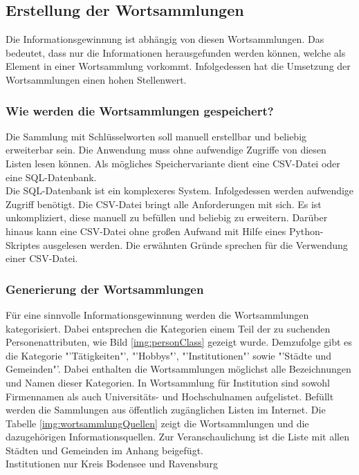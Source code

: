	\subsection{Erstellung der Wortsammlungen}
	Die Informationsgewinnung ist abhängig von diesen Wortsammlungen. Das bedeutet, dass nur die Informationen herausgefunden werden können, welche als Element in einer Wortsammlung vorkommt. Infolgedessen hat die Umsetzung der Wortsammlungen einen hohen Stellenwert.
	
		\subsubsection{Wie werden die Wortsammlungen gespeichert?}
		Die Sammlung mit Schlüsselworten soll manuell erstellbar und beliebig erweiterbar sein. Die Anwendung muss ohne aufwendige Zugriffe von diesen Listen lesen können. Als mögliches Speichervariante dient eine CSV-Datei oder eine SQL-Datenbank.\\
		Die SQL-Datenbank ist ein komplexeres System. Infolgedessen werden aufwendige Zugriff benötigt. Die CSV-Datei bringt alle Anforderungen mit sich. Es ist unkompliziert, diese manuell zu befüllen und beliebig zu erweitern. Darüber hinaus kann eine CSV-Datei ohne großen Aufwand mit Hilfe eines Python-Skriptes ausgelesen werden. Die erwähnten Gründe sprechen für die Verwendung einer CSV-Datei.
		
		\subsubsection{Generierung der Wortsammlungen}	
		Für eine sinnvolle Informationsgewinnung werden die Wortsammlungen kategorisiert. Dabei entsprechen die Kategorien einem Teil der zu suchenden Personenattributen, wie Bild \ref{img:personClass} gezeigt wurde. Demzufolge gibt es die Kategorie "'Tätigkeiten"', "'Hobbys"', "'Institutionen"' sowie "'Städte und Gemeinden"'. Dabei enthalten die Wortsammlungen möglichst alle Bezeichnungen und Namen dieser Kategorien. 
		In Wortsammlung für Institution sind sowohl Firmennamen als auch Universitäts- und Hochschulnamen aufgelistet. Befüllt werden die Sammlungen aus öffentlich zugänglichen Listen im Internet. Die Tabelle \ref{img:wortsammlungQuellen} zeigt die Wortsammlungen und die dazugehörigen Informationsquellen. Zur Veranschaulichung ist die Liste mit allen Städten und Gemeinden im Anhang beigefügt. \\%
		Institutionen nur Kreis Bodensee und Ravensburg
		
